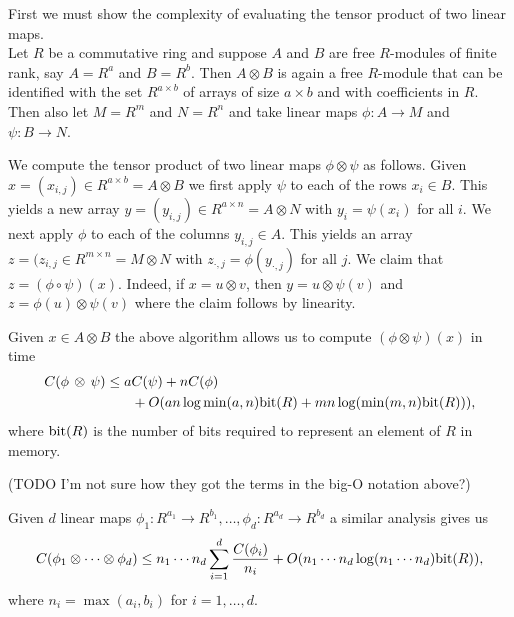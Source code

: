 First we must show the complexity of evaluating the tensor product of two linear maps.\\
Let $R$ be a commutative ring and suppose $A$ and $B$ are free $R$-modules of finite rank, say $A = R^a$ and $B = R^b$. Then $A \otimes B$ is again a free $R$-module that can be identified with the set $R^{a \times b}$ of arrays of size $a \times b$ and with coefficients in $R$. Then also let $M = R^m$ and $N = R^n$ and take linear maps $\phi: A \to M$ and $\psi : B \to N$.

We compute the tensor product of two linear maps $\phi \otimes \psi$ as follows. Given $x = (x_{i,j}) \in R^{a \times b} = A \otimes B$ we first apply $\psi$ to each of the rows $x_i \in B$. This yields a new array $y = (y_{i, j}) \in R^{a \times n} = A \otimes N$ with $y_i = \psi(x_i)$ for all $i$. We next apply $\phi$ to each of the columns $y_{i, j} \in A$. This yields an array $z = (z_{i, j} \in R^{m \times n} = M \otimes N$ with $z_{\cdot , j} = \phi(y_{\cdot, j})$ for all $j$. We claim that $z = (\phi \circ \psi)(x)$. Indeed, if $x = u \otimes v$, then $y = u \otimes \psi(v)$ and $z = \phi(u) \otimes \psi(v)$ where the claim follows by linearity.

Given $x \in A \otimes B$ the above algorithm allows us to compute $(\phi \otimes \psi) (x)$ in time
\begin{align*}
    C(\phi \,\otimes\, \psi) \leq a&C(\psi) + nC(\phi)\\
                                   &+ O(a n \log \min(a, n) \textrm{bit}(R) + m n \log( \min (m, n)\textrm{bit}(R))),
\end{align*}
where $\textrm{bit}(R)$ is the number of bits required to represent an element of $R$ in memory.

(TODO I'm not sure how they got the terms in the big-O notation above?)

\begin{lemma}\label{lem:multi-dim-dft}
    Given $d$ linear maps $\phi_1: R^{a_1} \to R^{b_1}, \ldots, \phi_d: R^{a_d} \to R^{b_d}$ a similar analysis gives us
    \[
        C(\phi_1 \otimes \cdots \otimes \phi_d) \leq n_1\cdots n_d \sum^d_{i = 1} \frac{C(\phi_i)}{n_i} + O(n_1\cdots n_d \log (n_1 \cdots n_d) \textrm{bit}(R)),
    \]
    where $n_i = \max(a_i, b_i)$ for $i = 1, \ldots, d$.
\end{lemma}



